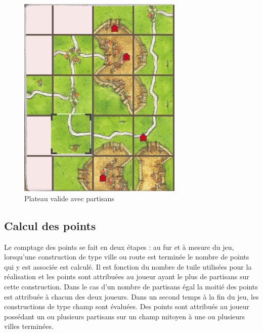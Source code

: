 \documentclass[a4paper, 11pt]{article}
\begin{document}
			\begin{figure}[H]
            \centering
			  \includegraphics[width=0.7\textwidth]{img/plateau.jpg}
			  \caption{Plateau valide avec partisans}
			  \label{fig:plateau-partisans}
			\end{figure}


	\subsection{Calcul des points}\label{sec:calcul-points}
		\indent Le comptage des points se fait en deux étapes : au fur et à mesure du jeu, lorsqu'une construction de type ville ou route est terminée le nombre de points qui y est associée est calculé. Il est fonction du nombre de tuile utilisées pour la réalisation et les points sont attribuées au joueur ayant le plus de partisans sur cette construction. Dans le cas d'un nombre de partisans égal la moitié des points est attribuée à chacun des deux joueurs. Dans un second temps à la fin du jeu, les constructions de type champ sont évaluées. Des points sont attribués au joueur possédant un ou plusieurs partisans sur un champ mitoyen à une ou plusieurs villes terminées.  
\end{document}
